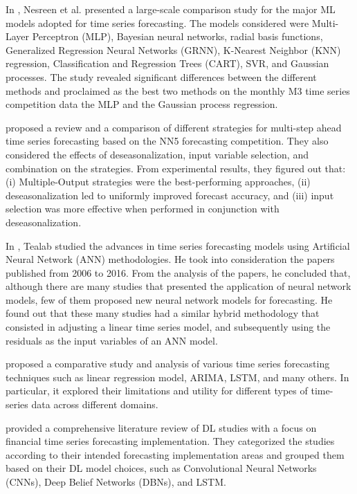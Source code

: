 In \cite{Nesreen2010}, Nesreen et al. presented a large-scale comparison study for the major ML models adopted for time series forecasting.
The models considered were Multi-Layer Perceptron (MLP), Bayesian neural networks, radial basis functions, Generalized Regression Neural Networks (GRNN), K-Nearest Neighbor (KNN) regression, Classification and Regression Trees (CART), SVR, and Gaussian processes.
The study revealed significant differences between the different methods and proclaimed as the best two methods on the monthly M3 time series competition data the MLP and the Gaussian process regression.

\cite{BENTAIEB20127067} proposed a review and a comparison of different strategies for multi-step ahead time series forecasting based on the NN5 forecasting competition.
They also considered the effects of deseasonalization, input variable selection, and combination on the strategies.
From experimental results, they figured out that:
(i) Multiple-Output strategies were the best-performing approaches,
(ii) deseasonalization led to uniformly improved forecast accuracy,
and (iii) input selection was more effective when performed in conjunction with deseasonalization.

In \cite{TEALAB2018334}, Tealab studied the advances in time series forecasting models using Artificial Neural Network (ANN) methodologies.
He took into consideration the papers published from 2006 to 2016.
From the analysis of the papers, he concluded that, although there are many studies that presented the application of neural network models, few of them proposed new neural network models for forecasting.
He found out that these many studies had a similar hybrid methodology that consisted in adjusting a linear time series model, and subsequently using the residuals as the input variables of an ANN model.

\cite{Athiyarath2020} proposed a comparative study and analysis of various time series forecasting techniques such as linear regression model, ARIMA, LSTM, and many others.
In particular, it explored their limitations and utility for different types of time-series data across different domains.

\cite{SEZER2020106181} provided a comprehensive literature review of DL studies with a focus on financial time series forecasting implementation.
They categorized the studies according to their intended forecasting implementation areas and grouped them based on their DL model choices, such as Convolutional Neural Networks (CNNs), Deep Belief Networks (DBNs), and LSTM.

